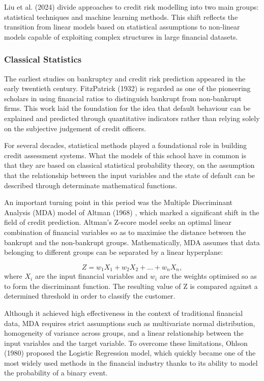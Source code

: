 Liu et al. (2024) \cite{liu2024credit} divide approaches to credit risk modelling into two main groups: statistical techniques and machine learning methods. This shift reflects the transition from linear models based on statistical assumptions to non-linear models capable of exploiting complex structures in large financial datasets.

\subsubsection{Classical Statistics}
\noindent
The earliest studies on bankruptcy and credit risk prediction appeared in the early twentieth century. FitzPatrick (1932) \cite{fitzpatrick1932comparison} is regarded as one of the pioneering scholars in using financial ratios to distinguish bankrupt from non-bankrupt firms. This work laid the foundation for the idea that default behaviour can be explained and predicted through quantitative indicators rather than relying solely on the subjective judgement of credit officers.

For several decades, statistical methods played a foundational role in building credit assessment systems. What the models of this school have in common is that they are based on classical statistical probability theory, on the assumption that the relationship between the input variables and the state of default can be described through determinate mathematical functions.

An important turning point in this period was the Multiple Discriminant Analysis (MDA) model of Altman (1968) \cite{altman1968financial}, which marked a significant shift in the field of credit prediction. Altman's Z-score model seeks an optimal linear combination of financial variables so as to maximise the distance between the bankrupt and the non-bankrupt groups. Mathematically, MDA assumes that data belonging to different groups can be separated by a linear hyperplane:

\begin{equation}
Z = w_1X_1+w_2X_2+...+w_nX_n,
\end{equation}
where $X_i$ are the input financial variables and $w_i$ are the weights optimised so as to form the discriminant function. The resulting value of Z is compared against a determined threshold in order to classify the customer.

Although it achieved high effectiveness in the context of traditional financial data, MDA requires strict assumptions such as multivariate normal distribution, homogeneity of variance across groups, and a linear relationship between the input variables and the target variable. To overcome these limitations, Ohlson (1980) \cite{ohlson1980financial} proposed the Logistic Regression model, which quickly became one of the most widely used methods in the financial industry thanks to its ability to model the probability of a binary event.

